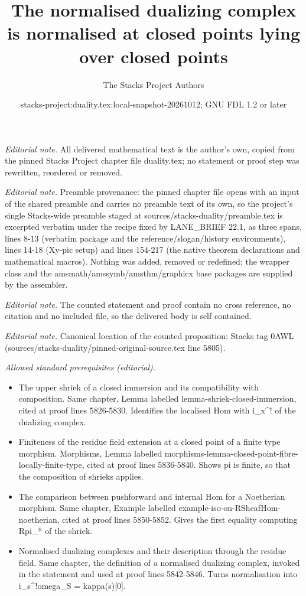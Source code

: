 \documentclass[10pt,a4paper]{amsart}
\title{The normalised dualizing complex is normalised at closed points lying over closed points}
\author{The Stacks Project Authors}
\date{stacks-project:duality.tex:local-snapshot-20261012; GNU FDL 1.2 or later}
\theoremstyle{plain}
\theoremstyle{definition}
\theoremstyle{remark}
\numberwithin{equation}{subsection}
\begin{document}
\maketitle
\noindent\textit{Editorial note.} All delivered mathematical text is the author's own, copied from the pinned Stacks Project chapter file duality.tex; no statement or proof step was rewritten, reordered or removed.\par\medskip
\noindent\textit{Editorial note.} Preamble provenance: the pinned chapter file opens with an input of the shared preamble and carries no preamble text of its own, so the project's single Stacks-wide preamble staged at sources/stacks-duality/preamble.tex is excerpted verbatim under the recipe fixed by LANE\_BRIEF 22.1, as three spans, lines 8-13 (verbatim package and the reference/slogan/history environments), lines 14-18 (Xy-pic setup) and lines 154-217 (the native theorem declarations and mathematical macros). Nothing was added, removed or redefined; the wrapper class and the amsmath/amssymb/amsthm/graphicx base packages are supplied by the assembler.\par\medskip
\noindent\textit{Editorial note.} The counted statement and proof contain no cross reference, no citation and no included file, so the delivered body is self contained.\par\medskip
\noindent\textit{Editorial note.} Canonical location of the counted proposition: Stacks tag 0AWL (sources/stacks-duality/pinned-original-source.tex line 5805).\par\medskip
\noindent\textit{Allowed standard prerequisites (editorial).}\begin{itemize}
\item The upper shriek of a closed immersion and its compatibility with composition. Same chapter, Lemma labelled lemma-shriek-closed-immersion, cited at proof lines 5826-5830. Identifies the localised Hom with i\_x\textasciicircum{}! of the dualizing complex.
\item Finiteness of the residue field extension at a closed point of a finite type morphism. Morphisms, Lemma labelled morphisms-lemma-closed-point-fibre-locally-finite-type, cited at proof lines 5836-5840. Shows pi is finite, so that the composition of shrieks applies.
\item The comparison between pushforward and internal Hom for a Noetherian morphism. Same chapter, Example labelled example-iso-on-RSheafHom-noetherian, cited at proof lines 5850-5852. Gives the first equality computing Rpi\_* of the shriek.
\item Normalised dualizing complexes and their description through the residue field. Same chapter, the definition of a normalised dualizing complex, invoked in the statement and used at proof lines 5842-5846. Turns normalisation into i\_s\textasciicircum{}!omega\_S = kappa(s)[0].
\end{itemize}\medskip
\end{document}
